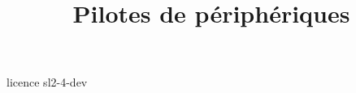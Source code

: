 \documentclass {beamer}
\title {Pilotes de périphériques}
\begin{document}
 {licence}
 {sl2-4-dev}
\end{document}
